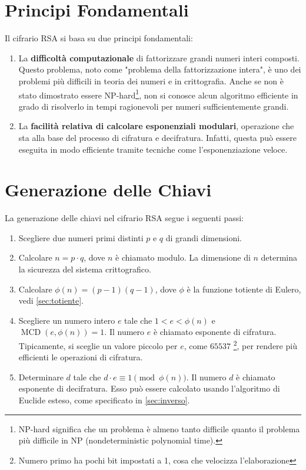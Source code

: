 \documentclass[a4paper,12pt]{report}
\begin{document}
\section{Principi Fondamentali}
Il cifrario RSA si basa su due principi fondamentali:

\begin{enumerate}
    \item La \textbf{difficoltà computazionale} di fattorizzare grandi numeri interi composti. Questo problema, noto come "problema della fattorizzazione intera", è uno dei problemi più difficili in teoria dei numeri e in crittografia. Anche se non è stato dimostrato essere NP-hard\footnote[1]{NP-hard significa che un problema è almeno tanto difficile quanto il problema più difficile in NP (nondeterministic polynomial time).}, non si conosce alcun algoritmo efficiente in grado di risolverlo in tempi ragionevoli per numeri sufficientemente grandi.
    \item La \textbf{facilità relativa di calcolare esponenziali modulari}, operazione che sta alla base del processo di cifratura e decifratura. Infatti, questa può essere eseguita in modo efficiente tramite tecniche come l'esponenziazione veloce.
\end{enumerate}

\section{Generazione delle Chiavi}
La generazione delle chiavi nel cifrario RSA segue i seguenti passi:

\begin{enumerate}
    \item Scegliere due numeri primi distinti $p$ e $q$ di grandi dimensioni.
    \item Calcolare $n = p \cdot q$, dove $n$ è chiamato modulo. La dimensione di $n$ determina la sicurezza del sistema crittografico.
    \item Calcolare $\phi(n) = (p - 1)(q - 1)$, dove $\phi$ è la funzione totiente di Eulero, vedi \ref{sec:totiente}.
    \item Scegliere un numero intero $e$ tale che $1 < e < \phi(n)$ e $\operatorname{MCD}(e, \phi(n)) = 1$. Il numero $e$ è chiamato esponente di cifratura. Tipicamente, si sceglie un valore piccolo per $e$, come $65537$ \footnote{Numero primo ha pochi bit impostati a 1, cosa che velocizza l'elaborazione}, per rendere più efficienti le operazioni di cifratura.
    \item Determinare $d$ tale che $d \cdot e \equiv 1 \pmod{\phi(n)}$. Il numero $d$ è chiamato esponente di decifratura. Esso può essere calcolato usando l'algoritmo di Euclide esteso, come specificato in \ref{sec:inverso}.
\end{enumerate}
\end{document}
